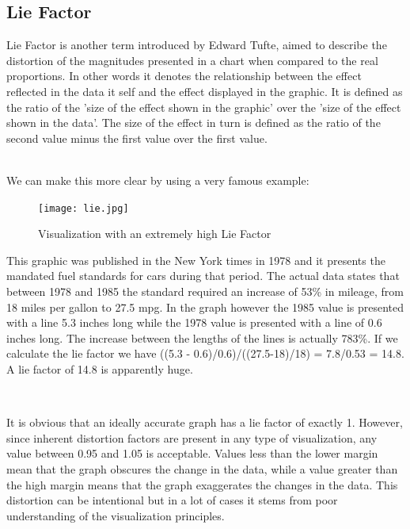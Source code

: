 \documentclass[16pt]{extreport}
\begin{document}
\subsection{Lie Factor}
\parbox{\linewidth}{
\justify
\large{Lie Factor is another term introduced by Edward Tufte, aimed to describe the distortion of the magnitudes presented in a chart when compared to the real proportions. In other words it denotes the relationship between the effect reflected in the data it self and the effect displayed in the graphic. It is defined as the ratio of the 'size of the effect shown in the graphic' over the 'size of the effect shown in the data'. The size of the effect in turn is defined as the ratio of the second value minus the first value over the first value.}}
\hfill \break\\


We can make this more clear by using a very famous example: 

\begin{center}
	\begin{figure}[h]
		\texttt{[image: lie.jpg]}
		\caption{Visualization with an extremely high Lie Factor}
	\end{figure}
\end{center}

\parbox{\linewidth}{
\justify
\large{This graphic was published in the New York times in 1978 and it presents the mandated fuel standards for cars during that period. The actual data states that between 1978 and 1985 the standard required an increase of 53\% in mileage, from 18 miles per gallon to 27.5 mpg. In the graph however the 1985 value is presented with a line 5.3 inches long while the 1978 value is presented with a line of 0.6 inches long. The increase between the lengths of the lines is actually 783\%. If we calculate the lie factor we have ((5.3 - 0.6)/0.6)/((27.5-18)/18) = 7.8/0.53 = 14.8. A lie factor of 14.8 is apparently huge. }}
\hfill \break\\

\parbox{\linewidth}{
\justify
\large{
It is obvious that an ideally accurate graph has a lie factor of exactly 1. However, since inherent distortion factors are present in any type of visualization, any value between 0.95 and 1.05 is acceptable. Values less than the lower margin mean that the graph obscures the change in the data, while a value greater than the high margin means that the graph exaggerates the changes in the data. This distortion can be intentional but in a lot of cases it stems from poor understanding of the visualization principles.}}
\hfill \break \\
\end{document}
